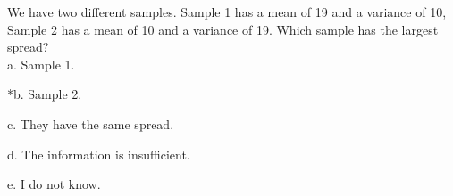 
We have two different samples. Sample 1 has a mean of 19 and a
variance of 10, Sample 2 has a mean of 10 and a variance of 19. Which
sample has the largest spread?\\

a. Sample 1.

*b. Sample 2.

c. They have the same spread.

d. The information is insufficient.

e. I do not know.\\
